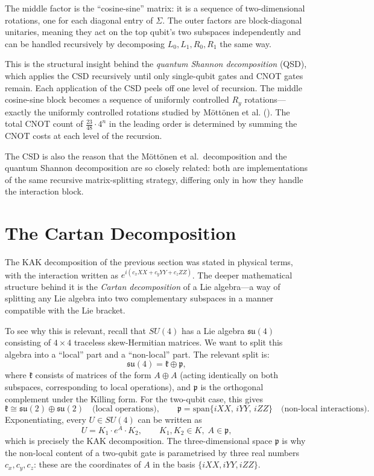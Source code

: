 \documentclass[12pt, a4paper, oneside]{report}
\theoremstyle{plain}
\theoremstyle{definition}
\theoremstyle{remark}
\newcommand{\Ry}{R_y}
\begin{document}
The middle factor is the ``cosine-sine'' matrix: it is a sequence of two-dimensional
rotations, one for each diagonal entry of $\Sigma$. The outer factors are block-diagonal
unitaries, meaning they act on the top qubit's two subspaces independently and can be handled
recursively by decomposing $L_0, L_1, R_0, R_1$ the same way.

This is the structural insight behind the \emph{quantum Shannon decomposition} (QSD), which
applies the CSD recursively until only single-qubit gates and CNOT gates remain. Each
application of the CSD peels off one level of recursion. The middle cosine-sine block becomes
a sequence of uniformly controlled $\Ry$ rotations---exactly the uniformly controlled
rotations studied by Möttönen et al. (). The total CNOT count of
$\frac{23}{48} \cdot 4^n$ in the leading order is determined by summing the CNOT costs at
each level of the recursion.

The CSD is also the reason that the Möttönen et al.\ decomposition and the quantum Shannon
decomposition are so closely related: both are implementations of the same recursive
matrix-splitting strategy, differing only in how they handle the interaction block.


\section{The Cartan Decomposition}

The KAK decomposition of the previous section was stated in physical terms, with the
interaction written as $e^{i(c_x XX + c_y YY + c_z ZZ)}$. The deeper mathematical
structure behind it is the \emph{Cartan decomposition} of a Lie algebra---a way of splitting
any Lie algebra into two complementary subspaces in a manner compatible with the Lie bracket.

To see why this is relevant, recall that $SU(4)$ has a Lie algebra $\mathfrak{su}(4)$
consisting of $4 \times 4$ traceless skew-Hermitian matrices. We want to split this algebra
into a ``local'' part and a ``non-local'' part. The relevant split is:
\[
  \mathfrak{su}(4) = \mathfrak{k} \oplus \mathfrak{p},
\]
where $\mathfrak{k}$ consists of matrices of the form $A \oplus A$ (acting identically on
both subspaces, corresponding to local operations), and $\mathfrak{p}$ is the orthogonal
complement under the Killing form. For the two-qubit case, this gives
\[
  \mathfrak{k} \cong \mathfrak{su}(2) \oplus \mathfrak{su}(2)
  \quad\text{(local operations)},
  \qquad
  \mathfrak{p} = \mathrm{span}\{iXX,\,iYY,\,iZZ\}
  \quad\text{(non-local interactions)}.
\]
Exponentiating, every $U \in SU(4)$ can be written as
\[
  U = K_1 \cdot e^{A} \cdot K_2, \qquad K_1, K_2 \in K,\; A \in \mathfrak{p},
\]
which is precisely the KAK decomposition. The three-dimensional space $\mathfrak{p}$ is
why the non-local content of a two-qubit gate is parametrised by three real numbers $c_x,
c_y, c_z$: these are the coordinates of $A$ in the basis $\{iXX, iYY, iZZ\}$.
\end{document}

